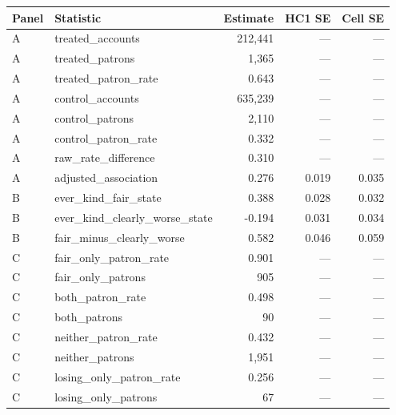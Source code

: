 \begin{tabular}{llrrr}
\toprule
Panel & Statistic & Estimate & HC1 SE & Cell SE \\
\midrule
A & treated\_accounts & 212,441 & --- & --- \\
A & treated\_patrons & 1,365 & --- & --- \\
A & treated\_patron\_rate & 0.643 & --- & --- \\
A & control\_accounts & 635,239 & --- & --- \\
A & control\_patrons & 2,110 & --- & --- \\
A & control\_patron\_rate & 0.332 & --- & --- \\
A & raw\_rate\_difference & 0.310 & --- & --- \\
A & adjusted\_association & 0.276 & 0.019 & 0.035 \\
B & ever\_kind\_fair\_state & 0.388 & 0.028 & 0.032 \\
B & ever\_kind\_clearly\_worse\_state & -0.194 & 0.031 & 0.034 \\
B & fair\_minus\_clearly\_worse & 0.582 & 0.046 & 0.059 \\
C & fair\_only\_patron\_rate & 0.901 & --- & --- \\
C & fair\_only\_patrons & 905 & --- & --- \\
C & both\_patron\_rate & 0.498 & --- & --- \\
C & both\_patrons & 90 & --- & --- \\
C & neither\_patron\_rate & 0.432 & --- & --- \\
C & neither\_patrons & 1,951 & --- & --- \\
C & losing\_only\_patron\_rate & 0.256 & --- & --- \\
C & losing\_only\_patrons & 67 & --- & --- \\
\bottomrule
\end{tabular}
